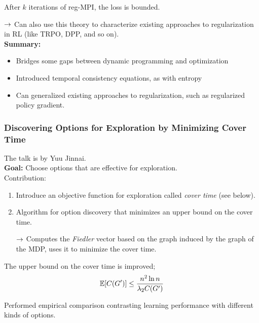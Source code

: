 \begin{theorem}
After $k$ iterations of reg-MPI, the loss is bounded.
\end{theorem}

$\rightarrow$ Can also use this theory to characterize existing approaches to regularization in RL (like TRPO, DPP, and so on). \\

{\bf Summary:}
\begin{itemize}
    \item Bridges some gaps between dynamic programming and optimization
    \item Introduced temporal consistency equations, as with entropy
    \item Can generalized existing approaches to regularization, such as regularized policy gradient.
\end{itemize}


\spacerule

\subsubsection{Discovering Options for Exploration by Minimizing Cover Time~\cite{jinnai2019discovering}}

 The talk is by Yuu Jinnai. \\

{\bf Goal:} Choose options that are effective for exploration. \\

Contribution:
\begin{enumerate}
    \item Introduce an objective function for exploration called {\it cover time} (see below).
    \item Algorithm for option discovery that minimizes an upper bound on the cover time.
    
    $\rightarrow$ Computes the {\it Fiedler} vector based on the graph induced by the graph of the MDP, uses it to minimize the cover time.
\end{enumerate}


\begin{theorem}
The upper bound on the cover time is improved;
\[
\mathbb{E}[C(G')] \leq \frac{n^2 \ln n}{\lambda_2 C(G')}
\]
\end{theorem}

Performed empirical comparison contrasting learning performance with different kinds of options. \\

